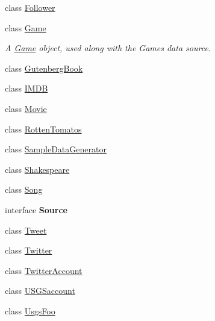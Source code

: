 \begin{DoxyCompactItemize}
\item 
class \mbox{\hyperlink{classbridges_1_1data__src__dependent_1_1_follower}{Follower}}
\item 
class \mbox{\hyperlink{classbridges_1_1data__src__dependent_1_1_game}{Game}}
\begin{DoxyCompactList}\small\item\em A \mbox{\hyperlink{classbridges_1_1data__src__dependent_1_1_game}{Game}} object, used along with the Games data source. \end{DoxyCompactList}\item 
class \mbox{\hyperlink{classbridges_1_1data__src__dependent_1_1_gutenberg_book}{Gutenberg\+Book}}
\item 
class \mbox{\hyperlink{classbridges_1_1data__src__dependent_1_1_i_m_d_b}{I\+M\+DB}}
\item 
class \mbox{\hyperlink{classbridges_1_1data__src__dependent_1_1_movie}{Movie}}
\item 
class \mbox{\hyperlink{classbridges_1_1data__src__dependent_1_1_rotten_tomatos}{Rotten\+Tomatos}}
\item 
class \mbox{\hyperlink{classbridges_1_1data__src__dependent_1_1_sample_data_generator}{Sample\+Data\+Generator}}
\item 
class \mbox{\hyperlink{classbridges_1_1data__src__dependent_1_1_shakespeare}{Shakespeare}}
\item 
class \mbox{\hyperlink{classbridges_1_1data__src__dependent_1_1_song}{Song}}
\item 
interface {\bfseries Source}
\item 
class \mbox{\hyperlink{classbridges_1_1data__src__dependent_1_1_tweet}{Tweet}}
\item 
class \mbox{\hyperlink{classbridges_1_1data__src__dependent_1_1_twitter}{Twitter}}
\item 
class \mbox{\hyperlink{classbridges_1_1data__src__dependent_1_1_twitter_account}{Twitter\+Account}}
\item 
class \mbox{\hyperlink{classbridges_1_1data__src__dependent_1_1_u_s_g_saccount}{U\+S\+G\+Saccount}}
\item 
class \mbox{\hyperlink{classbridges_1_1data__src__dependent_1_1_usgs_foo}{Usgs\+Foo}}
\end{DoxyCompactItemize}
